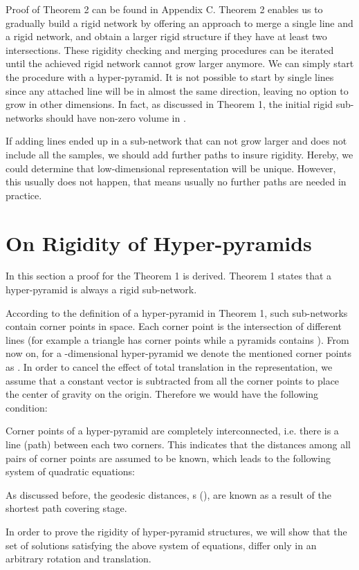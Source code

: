 \documentclass[10pt,journal,cspaper,compsoc]{IEEEtran}
\begin{document}
Proof of Theorem 2 can be found in Appendix C. Theorem 2 enables us to gradually build a rigid network by offering an approach to merge a single line and a rigid network, and obtain a larger rigid structure if they have at least two intersections. These rigidity checking and merging procedures can be iterated until the achieved rigid network cannot grow larger anymore. We can simply start the procedure with a hyper-pyramid. It is not possible to start by single lines since any attached line will be in almost the same direction, leaving no option to grow in other dimensions. In fact, as discussed in Theorem 1, the initial rigid sub-networks should have non-zero volume in .

If adding lines ended up in a sub-network that can not grow larger and does not include all the samples, we should add further paths to insure rigidity. Hereby, we could determine that low-dimensional representation will be unique. However, this usually does not happen, that means usually no further paths are needed in practice.

\section{On Rigidity of Hyper-pyramids}
In this section a proof for the Theorem 1 is derived. Theorem 1 states that a hyper-pyramid is always a rigid sub-network.

According to the definition of a hyper-pyramid in Theorem 1, such sub-networks contain  corner points in  space. Each corner point is the intersection of  different lines (for example a triangle has  corner points while a pyramids contains ). From now on, for a -dimensional hyper-pyramid we denote the mentioned corner points as . In order to cancel the effect of total translation in the representation, we assume that a constant vector  is subtracted from all the corner points to place the center of gravity on the origin. Therefore we would have the following condition:


Corner points of a hyper-pyramid are completely interconnected, i.e. there is a line (path) between each two corners. This indicates that the distances among all pairs of corner points are assumed to be known, which leads to the following system of quadratic equations:

As discussed before, the geodesic distances, s (), are known as a result of the shortest path covering stage.

In order to prove the rigidity of hyper-pyramid structures, we will show that the set of solutions satisfying the above system of equations, differ only in an arbitrary rotation and translation.
\end{document}
